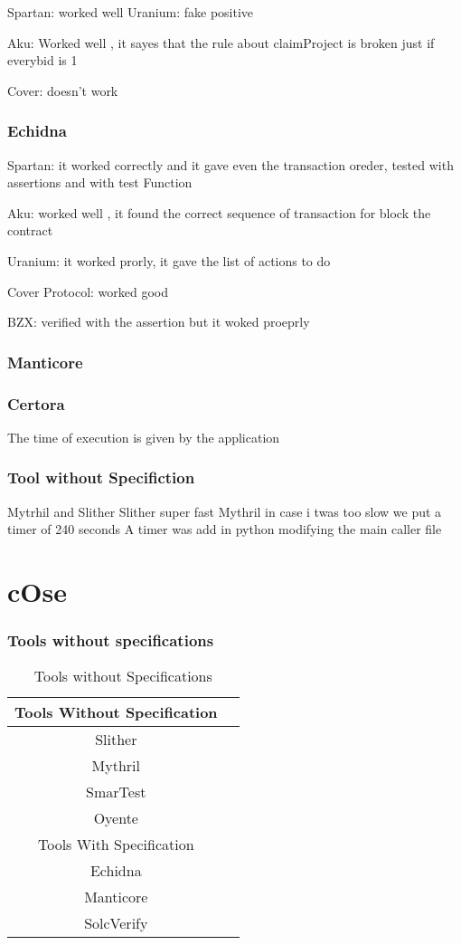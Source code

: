 Spartan: worked well
Uranium: fake positive

Aku: Worked well , it sayes that the rule about claimProject is broken just if everybid is 1 

Cover: doesn't work 
\subsection {Echidna}
Spartan: it worked correctly and it gave even the transaction oreder, tested with assertions and with test Function

Aku: worked well , it found the correct sequence of transaction for block the contract 

Uranium: it worked prorly, it gave the list of actions to do 

Cover Protocol: worked good


BZX: verified with the assertion but it woked proeprly



\subsection{Manticore}

\subsection{Certora}
The time of execution is given by the application
\subsection{Tool without Specifiction}
Mytrhil and Slither 
Slither super fast 
Mythril in case i twas too slow we put a timer of 240 seconds
A timer was add in python modifying the main caller file 

\chapter {cOse}
\subsection{Tools without specifications}
\label{ToolsWithouSpecifications}
\begin{table*}
  \caption{Tools without Specifications}
  \label{tab:Toolsee}
  \begin{tabular}{cc}
  \toprule
    Tools Without Specification\\
    \midrule
    Slither \\
    Mythril \\
    SmarTest \\
    Oyente  \\
    \toprule
    Tools With Specification\\
    \midrule
    Echidna \\
    Manticore  \\
    SolcVerify\\
    \bottomrule
 \end{tabular}
\end{table*}

